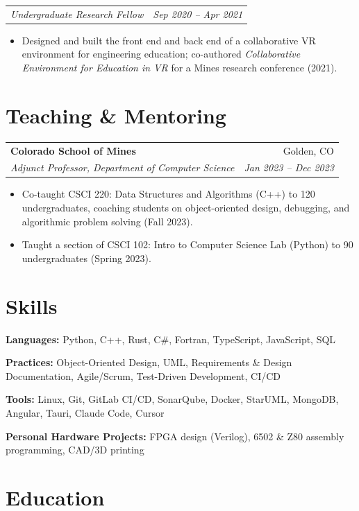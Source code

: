 \documentclass[letterpaper,10pt]{article}
\makeatletter
\newcommand{\entry}[4]{%
  \begin{tabularx}{\linewidth}{@{}X r@{}}
    \textbf{#1} & #2 \\
    \textit{#3} & \textit{\small #4} \\
  \end{tabularx}\vspace{-2pt}%
}
\newcommand{\subentry}[2]{%
  \begin{tabularx}{\linewidth}{@{}X r@{}}
    \textit{#1} & \textit{\small #2} \\
  \end{tabularx}\vspace{-2pt}%
}
\newcommand{\skillrow}[2]{\textbf{#1:} #2\par\vspace{1pt}}
\makeatother
\begin{document}
\subentry{Undergraduate Research Fellow}{Sep 2020 -- Apr 2021}
\begin{itemize}
  \item Designed and built the front end and back end of a collaborative VR environment for engineering education;
        co-authored \textit{Collaborative Environment for Education in VR} for a Mines research conference (2021).
\end{itemize}

\section{Teaching \& Mentoring}

\entry{Colorado School of Mines}{Golden, CO}{Adjunct Professor, Department of Computer Science}{Jan 2023 -- Dec 2023}
\begin{itemize}
  \item Co-taught CSCI 220: Data Structures and Algorithms (C++) to 120 undergraduates, coaching students on
        object-oriented design, debugging, and algorithmic problem solving (Fall 2023).
  \item Taught a section of CSCI 102: Intro to Computer Science Lab (Python) to 90 undergraduates (Spring 2023).
\end{itemize}

\section{Skills}
\skillrow{Languages}{Python, C++, Rust, C\#, Fortran, TypeScript, JavaScript, SQL}
\skillrow{Practices}{Object-Oriented Design, UML, Requirements \& Design Documentation, Agile/Scrum, Test-Driven Development, CI/CD}
\skillrow{Tools}{Linux, Git, GitLab CI/CD, SonarQube, Docker, StarUML, MongoDB, Angular, Tauri, Claude Code, Cursor}
\skillrow{Personal Hardware Projects}{FPGA design (Verilog), 6502 \& Z80 assembly programming, CAD/3D printing}

\section{Education}
\end{document}
